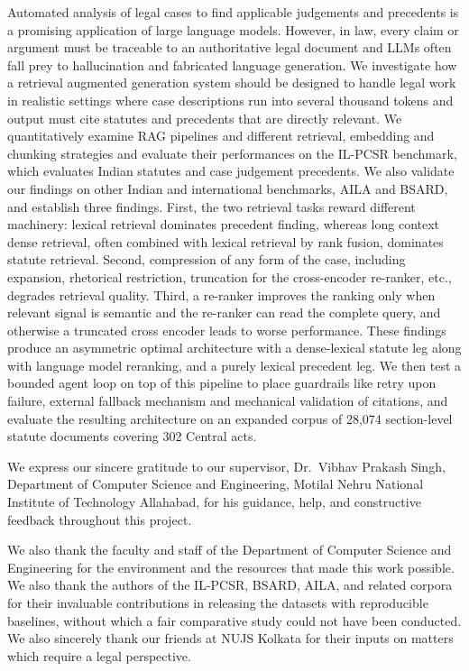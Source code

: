 \documentclass{mnnit}
\begin{document}
Automated analysis of legal cases to find applicable
judgements and precedents is a promising application of large
language models. However, in law, every claim or argument must
be traceable to an authoritative legal document and LLMs often
fall prey to hallucination and fabricated language generation.
We investigate how a retrieval augmented generation system
should be designed to handle legal work in realistic settings
where case descriptions run into several thousand tokens and
output must cite statutes and precedents that are directly
relevant. We quantitatively examine RAG pipelines and different
retrieval, embedding and chunking strategies and evaluate their
performances on the IL-PCSR benchmark, which evaluates Indian
statutes and case judgement precedents. We also validate
our findings on other Indian and international benchmarks, AILA
and BSARD, and establish three findings. First, the two retrieval tasks reward different
machinery: lexical retrieval dominates precedent finding,
whereas long context dense retrieval, often combined with
lexical retrieval by rank fusion, dominates statute retrieval.
Second, compression of any form of the case, including
expansion, rhetorical restriction, truncation for the
cross-encoder re-ranker, etc., degrades retrieval quality. Third, a re-ranker improves the ranking only
when relevant signal is semantic and the re-ranker can read the
complete query, and otherwise a truncated cross encoder leads
to worse performance. These findings produce an asymmetric
optimal architecture with a dense-lexical statute leg along
with language model reranking, and a purely lexical precedent
leg. We then test a bounded agent loop on top of this
pipeline to place guardrails like retry upon failure,
external fallback mechanism and mechanical validation of
citations, and evaluate the resulting architecture on an
expanded corpus of 28,074 section-level statute documents
covering 302 Central acts.

We express our sincere gratitude to our supervisor, Dr.\ Vibhav
Prakash Singh, Department of Computer Science and Engineering,
Motilal Nehru National Institute of Technology Allahabad, for his
guidance, help, and constructive feedback throughout this
project.

We also thank the faculty and staff of the Department of Computer
Science and Engineering for the environment and the resources
that made this work possible. We also thank the authors of the
IL-PCSR, BSARD, AILA, and related corpora for their invaluable
contributions in
releasing the datasets with reproducible baselines, without
which a fair comparative study could not have been conducted.
We also sincerely thank our friends at NUJS Kolkata for their
inputs on matters which require a legal perspective.
\end{document}

